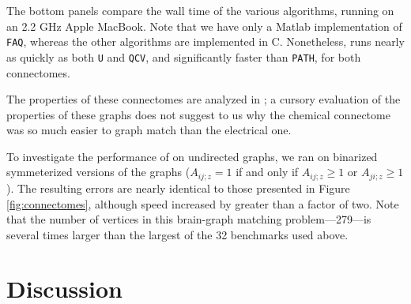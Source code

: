 \documentclass[10pt,journal,cspaper,compsoc]{IEEEtran}
\begin{document}
The bottom panels compare the wall time of the various algorithms, running on an 2.2 GHz Apple MacBook. Note that we have only a Matlab implementation of \texttt{FAQ}, whereas the other algorithms are implemented in C.  Nonetheless, \FAQ runs nearly as quickly as both \texttt{U} and \texttt{QCV}, and significantly faster than \texttt{PATH}, for both connectomes.  %


The properties of these connectomes are analyzed in \cite{Varshney2011}; a cursory evaluation of the properties of these graphs does not suggest to us why the chemical connectome was so much easier to graph match than the electrical one. 


To investigate the performance of \FAQ on undirected graphs, we ran \FAQ on binarized symmeterized versions of the graphs ($A_{ij;z}=1$ if and only if $A_{ij;z}\geq 1$ or $A_{ji;z} \geq 1$).  The resulting errors are nearly identical to those presented in Figure \ref{fig:connectomes}, although speed increased by greater than a factor of two. Note that the number of vertices in this brain-graph matching problem---279---is several times larger than the largest of the 32 benchmarks used above. 




\section{Discussion}
\label{sec:discussion}
\end{document}
